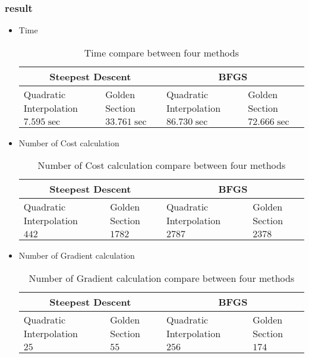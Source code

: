 \subsubsection{result}
\begin{itemize}
\item Time
	\begin{table}[H]
		\caption {Time compare between four methods} 
		\begin{center}
			\begin{tabular}{ |l|l|l|l| }
				\hline
				\multicolumn{2}{|c|}{Steepest Descent} &
				\multicolumn{2}{|c|}{BFGS} \Tstrut\\
				\hline
				Quadratic Interpolation & Golden Section & Quadratic Interpolation &
				Golden Section \Tstrut\\
				\hline
				$7.595\sec$ & $33.761\sec$ & $86.730\sec$ & $72.666\sec$\Tstrut\\
				\hline
			\end{tabular}
		\end{center}
	\end{table}
\item Number of Cost calculation
\begin{table}[H]
	\caption {Number of Cost calculation compare between four methods} 
	\begin{center}
		\begin{tabular}{ |l|l|l|l| }
			\hline
			\multicolumn{2}{|c|}{Steepest Descent} &
			\multicolumn{2}{|c|}{BFGS} \Tstrut\\
			\hline
			Quadratic Interpolation & Golden Section & Quadratic Interpolation &
			Golden Section \Tstrut\\
			\hline
			$442$ & $1782$ & $2787$ & $2378$\Tstrut\\
			\hline
		\end{tabular}
	\end{center}
\end{table}
\item Number of Gradient calculation
\begin{table}[H]
	\caption {Number of Gradient calculation compare between four methods} 
	\begin{center}
		\begin{tabular}{ |l|l|l|l| }
			\hline
			\multicolumn{2}{|c|}{Steepest Descent} &
			\multicolumn{2}{|c|}{BFGS} \Tstrut\\
			\hline
			Quadratic Interpolation & Golden Section & Quadratic Interpolation &
			Golden Section \Tstrut\\
			\hline
			$25$ & $55$ & $256$ & $174$\Tstrut\\
			\hline
		\end{tabular}
	\end{center}
\end{table}
\end{itemize}